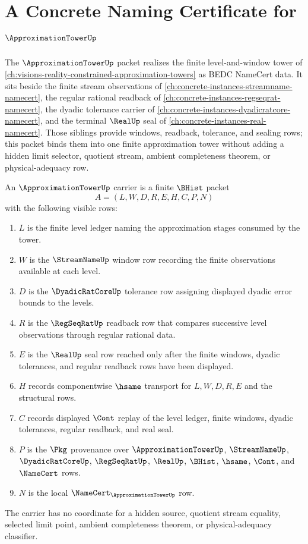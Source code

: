\chapter{A Concrete Naming Certificate for $\ApproximationTowerUp$}
\label{ch:concrete-instances-approximation-tower-namecert}

The $\ApproximationTowerUp$ packet realizes the finite level-and-window tower of \autoref{ch:visions-reality-constrained-approximation-towers} as BEDC NameCert data. It sits beside the finite stream observations of \autoref{ch:concrete-instances-streamname-namecert}, the regular rational readback of \autoref{ch:concrete-instances-regseqrat-namecert}, the dyadic tolerance carrier of \autoref{ch:concrete-instances-dyadicratcore-namecert}, and the terminal $\RealUp$ seal of \autoref{ch:concrete-instances-real-namecert}. Those siblings provide windows, readback, tolerance, and sealing rows; this packet binds them into one finite approximation tower without adding a hidden limit selector, quotient stream, ambient completeness theorem, or physical-adequacy row.

\begin{definition}
\label{def:approximation-tower-carrier}
An $\ApproximationTowerUp$ carrier is a finite $\BHist$ packet
$$
A=(L,W,D,R,E,H,C,P,N)
$$
with the following visible rows:
\begin{enumerate}
\item $L$ is the finite level ledger naming the approximation stages consumed by the tower.
\item $W$ is the $\StreamNameUp$ window row recording the finite observations available at each level.
\item $D$ is the $\DyadicRatCoreUp$ tolerance row assigning displayed dyadic error bounds to the levels.
\item $R$ is the $\RegSeqRatUp$ readback row that compares successive level observations through regular rational data.
\item $E$ is the $\RealUp$ seal row reached only after the finite windows, dyadic tolerances, and regular readback rows have been displayed.
\item $H$ records componentwise $\hsame$ transport for $L,W,D,R,E$ and the structural rows.
\item $C$ records displayed $\Cont$ replay of the level ledger, finite windows, dyadic tolerances, regular readback, and real seal.
\item $P$ is the $\Pkg$ provenance over $\ApproximationTowerUp$, $\StreamNameUp$, $\DyadicRatCoreUp$, $\RegSeqRatUp$, $\RealUp$, $\BHist$, $\hsame$, $\Cont$, and $\NameCert$ rows.
\item $N$ is the local $\NameCert_{\ApproximationTowerUp}$ row.
\end{enumerate}
The carrier has no coordinate for a hidden source, quotient stream equality, selected limit point, ambient completeness theorem, or physical-adequacy classifier.
\end{definition}


